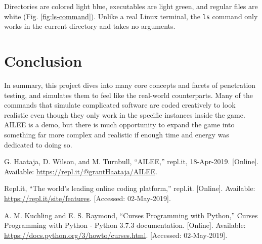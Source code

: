 \documentclass[conference]{IEEEtran}
\begin{document}
Directories are colored light blue, executables are light green, and regular files are white (Fig. \ref{fig:ls-command}). Unlike a real Linux terminal, the \texttt{ls} command only works in the current directory and takes no arguments. 

\section{Conclusion}
In summary, this project dives into many core concepts and facets of penetration testing, and simulates them to feel like the real-world counterparts. Many of the commands that simulate complicated software are coded creatively to look realistic even though they only work in the specific instances inside the game. AILEE is a demo, but there is much opportunity to expand the game into something far more complex and realistic if enough time and energy was dedicated to doing so.

\begin{thebibliography}{00}
 G. Haataja, D. Wilson, and M. Turnbull, “AILEE,” repl.it, 18-Apr-2019. [Online]. Available: \url{https://repl.it/@grantHaataja/AILEE}.

 Repl.it, ``The world's leading online coding platform,'' repl.it. [Online]. Available: \url{https://repl.it/site/features}. [Accessed: 02-May-2019].

 A. M. Kuchling and E. S. Raymond, ``Curses Programming with Python,'' Curses Programming with Python - Python 3.7.3 documentation. [Online]. Available: \url{https://docs.python.org/3/howto/curses.html}. [Accessed: 02-May-2019].

\end{thebibliography}
\end{document}
